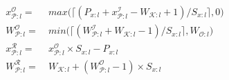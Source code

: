 \begin{align}
\label{eqn:xcoordinate}
x^\mathcal{O}_{\mathcal{P}:l} =&~ max\big(\lceil (P_{x:l} + x^\mathcal{I}_{\mathcal{P}:l} - W_{\mathcal{K}:l} + 1)/S_{x:l} \rceil, 0\big)\\
\label{eqn:patchwidth}
W^\mathcal{O}_{\mathcal{P}:l} =&~ min\big(\lceil (W^\mathcal{I}_{\mathcal{P}:l} + W_{\mathcal{K}:l} - 1)/ S_{x:l} \rceil, W_{\mathcal{O}:l}\big)\\
\label{eqn:xreadcoordinate}
x^\mathcal{R}_{\mathcal{P}:l} =&~ x^\mathcal{O}_{\mathcal{P}:l} \times S_{x:l} - P_{x:l}\\
\label{eqn:readpatchwidth}
W^\mathcal{R}_{\mathcal{P}:l} =&~ W_{\mathcal{K}:l} + (W^\mathcal{O}_{\mathcal{P}:l}-1) \times S_{x:l}
\end{align}






